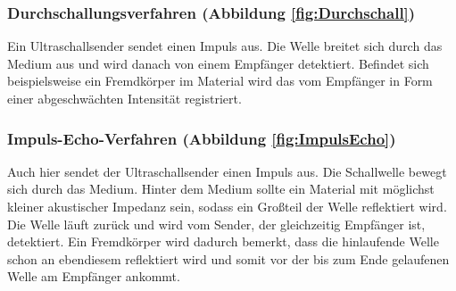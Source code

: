 \subsubsection*{Durchschallungsverfahren (Abbildung \ref{fig:Durchschall})}
Ein Ultraschallsender sendet einen Impuls aus. Die Welle breitet sich durch das Medium aus und wird danach von einem Empfänger detektiert. Befindet sich beispielsweise ein Fremdkörper im Material wird das vom Empfänger in Form einer abgeschwächten Intensität registriert.
\subsubsection*{Impuls-Echo-Verfahren (Abbildung \ref{fig:ImpulsEcho})}
Auch hier sendet der Ultraschallsender einen Impuls aus. Die Schallwelle bewegt sich  durch das Medium. Hinter dem Medium sollte ein Material mit möglichst kleiner akustischer Impedanz sein, sodass ein Großteil der Welle reflektiert wird. Die Welle läuft zurück und wird vom Sender, der gleichzeitig Empfänger ist, detektiert. Ein Fremdkörper wird dadurch bemerkt, dass die hinlaufende Welle schon an ebendiesem reflektiert wird und somit vor der bis zum Ende gelaufenen Welle am Empfänger ankommt.
